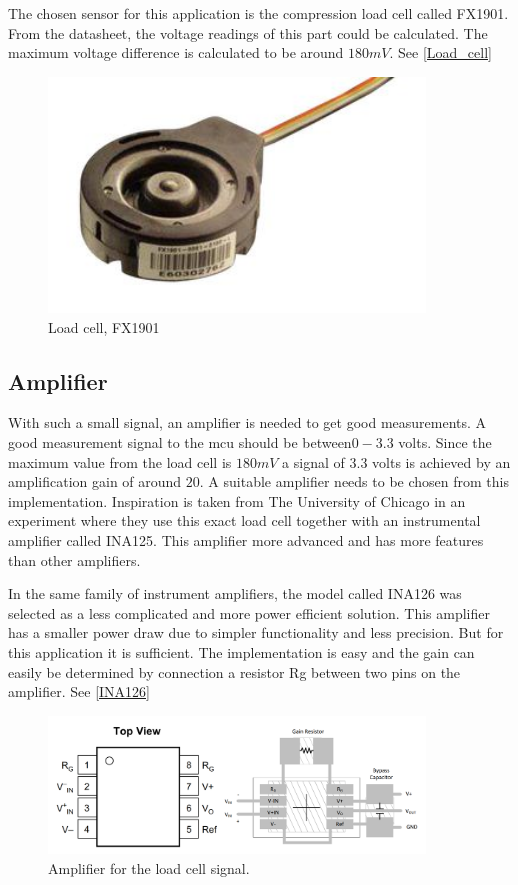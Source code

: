 The chosen sensor for this application is the compression load cell called FX1901\cite{load_cell}. 
From the datasheet, the voltage readings of this part could be calculated. The maximum voltage difference is calculated to be around $180mV$. See \autoref{Load_cell}
\begin{figure}[H]
\begin{center}
	\includegraphics[width = 10cm]{Figures/Load_cell.png}
	\caption{Load cell, FX1901}
	\label{Load_cell}
\end{center}
\end{figure}


\subsection{Amplifier}
With such a small signal, an amplifier is needed to get good measurements. A good measurement signal to the \gls{mcu} should be between$0-3.3$ volts. Since the maximum value from the load cell is $180mV$ a signal of $3.3$ volts is achieved by an amplification gain of around $20$.  
A suitable amplifier needs to be chosen from this implementation. Inspiration is taken from The University of Chicago\cite{UoC} in an experiment where they use this exact load cell together with an instrumental amplifier called INA125. This amplifier more advanced and has more features than other amplifiers.  

In the same family of instrument amplifiers, the model called INA126\cite{ina_126} was selected as a less complicated and more power efficient solution.  
This amplifier has a smaller power draw due to simpler functionality and less precision. But for this application it is sufficient.  
The implementation is easy and the gain can easily be determined by connection a resistor Rg between two pins on the amplifier. See  \autoref{INA126}

\begin{figure}[H]
\begin{center}
	\includegraphics[width = 10cm]{Figures/INA126_pinout.png}
	\caption{Amplifier for the load cell signal.}
	\label{INA126}
\end{center}
\end{figure}

